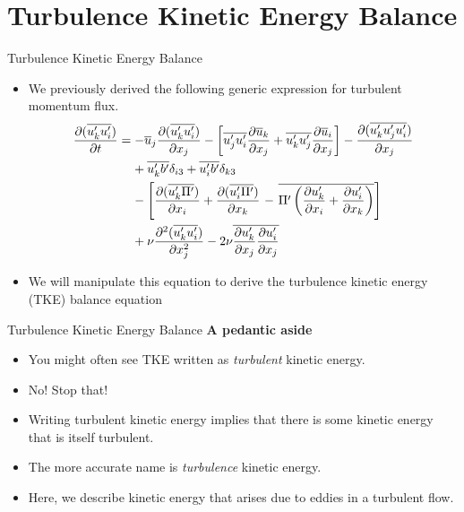 \section{Turbulence Kinetic Energy Balance}     %
\begin{frame}{Turbulence Kinetic Energy Balance}
\begin{itemize}
  	\item We previously derived the following generic expression for turbulent momentum flux.
  	\begin{align*}
  	\frac{\partial (\overline{u_k^\prime u_i^\prime})}{\partial t} &= - \overline u_j \frac{\partial (\overline{u_k^\prime u_i^\prime})}{\partial x_j} - \left[\overline{u_j^\prime u_i^\prime}\frac{\partial \overline u_k}{\partial x_j} + \overline{u_k^\prime u_j^\prime}\frac{\partial \overline u_i}{\partial x_j}\right] - \frac{\partial (\overline{u_k^\prime u_j^\prime u_i^\prime})}{\partial x_j} \\&\hphantom{=\ }+ \overline{u_k^\prime b^\prime}\delta_{i3} + \overline{u_i^\prime b^\prime}\delta_{k3}\\&\hphantom{=\ }-\left[ \frac{\partial(\overline{u_k^\prime \Pi^\prime})}{\partial x_i} + \frac{\partial(\overline{u_i^\prime \Pi^\prime})}{\partial x_k}\right. - \left.\overline{\Pi^\prime \left(\frac{\partial u_k^\prime}{\partial x_i} + \frac{\partial u_i^\prime}{\partial x_k}\right)}\right] \\&\hphantom{=\ }+\nu \frac{\partial^2 (\overline{u_k^\prime u_i^\prime})}{\partial x_j^2} - 2\nu \overline{\frac{\partial u_k^\prime}{\partial x_j}\frac{\partial u_i^\prime}{\partial x_j}}
  	\end{align*}
  	\item We will manipulate this equation to derive the turbulence kinetic energy (TKE) balance equation
  \end{itemize}
\end{frame}
\begin{frame}{Turbulence Kinetic Energy Balance}
\textbf{A pedantic aside}
\begin{itemize}
  	\item You might often see TKE written as \textit{turbulent} kinetic energy. 
  	\item No! Stop that!
  	\item Writing turbulent kinetic energy implies that there is some kinetic energy that is itself turbulent.
  	\item The more accurate name is \textit{turbulence} kinetic energy.
  	\item Here, we describe kinetic energy that arises due to eddies in a turbulent flow.
  \end{itemize}
\end{frame}

